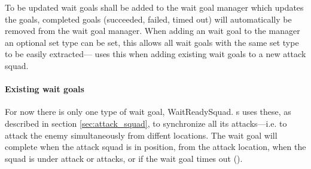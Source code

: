 To be updated wait goals shall be added to the wait goal manager which updates the goals, completed goals (succeeded, failed, timed out) will automatically be removed from the wait goal manager. When adding an wait goal to the manager an optional set type can be set, this allows all wait goals with the same set type to be easily extracted— uses this when adding existing wait goals to a new attack squad.

\paragraph{Existing wait goals}
For now there is only one type of wait goal, WaitReadySquad. s uses these, as described in section \ref{sec:attack_squad}, to synchronize all its attacks—i.e. to attack the enemy simultaneously from diffent locations. The wait goal will complete when the attack squad is in position, \squadAttackWaitingPositionDistanceFromGoal from the attack location, when the squad is under attack or attacks, or if the wait goal times out (\attackCoordinatorWaitGoalTimeout).